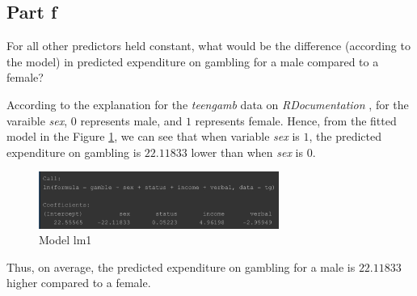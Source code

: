 \subsection{Part f}

\begin{question}
    For all other predictors held constant, what would be the difference (according to the model) in predicted expenditure on gambling for a male compared to a female?
\end{question}

\begin{answer}
    According to the explanation for the \textit{teengamb} data on \textit{RDocumentation} \cite{noauthor_teengamb_nodate}, for the varaible \textit{sex}, $0$ represents male, and $1$ represents female. Hence, from the fitted model in the Figure \ref{fig:fig8}, we can see that when variable \textit{sex} is $1$, the predicted expenditure on gambling is $22.11833$ lower than when \textit{sex} is $0$.
    \begin{figure}[H]
        \centering
        \includegraphics[width=0.7\textwidth]{Figure 8.jpeg}
        \caption{\label{fig:fig8}Model lm1}
    \end{figure}
    Thus, on average, the predicted expenditure on gambling for a male is $22.11833$ higher compared to a female.
\end{answer}
